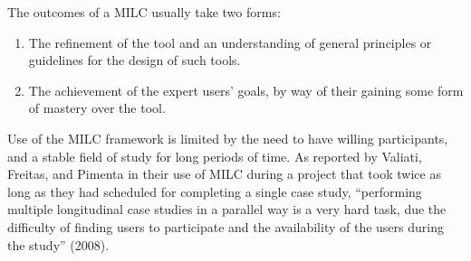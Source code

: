 The outcomes of a MILC usually take two forms:

\begin{enumerate}
\def\labelenumi{\arabic{enumi}.}
\item
  The refinement of the tool and an understanding of general principles
  or guidelines for the design of such tools.
\item
  The achievement of the expert users' goals, by way of their gaining
  some form of mastery over the tool.
\end{enumerate}

Use of the MILC framework is limited by the need to have willing
participants, and a stable field of study for long periods of time. As
reported by Valiati, Freitas, and Pimenta in their use of MILC during a
project that took twice as long as they had scheduled for completing a
single case study, ``performing multiple longitudinal case studies in a
parallel way is a very hard task, due the difficulty of finding users to
participate and the availability of the users during the study'' (2008).\\